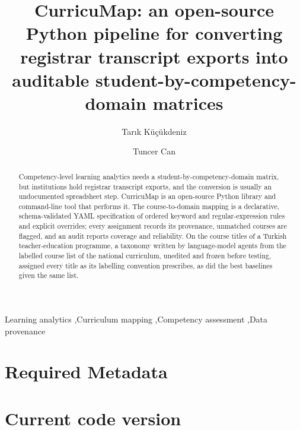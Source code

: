 \documentclass[preprint,12pt,a4paper]{elsarticle}
\begin{document}
\begin{frontmatter}

\title{CurricuMap: an open-source Python pipeline for converting registrar transcript exports into auditable student-by-competency-domain matrices}

\author[iue]{Tar{\i}k K\"u\c{c}\"ukdeniz}
\author[elt]{Tuncer Can}


\begin{abstract}
Competency-level learning analytics needs a student-by-competency-domain matrix, but institutions hold registrar transcript exports, and the conversion is usually an undocumented spreadsheet step. CurricuMap is an open-source Python library and command-line tool that performs it. The course-to-domain mapping is a declarative, schema-validated YAML specification of ordered keyword and regular-expression rules and explicit overrides; every assignment records its provenance, unmatched courses are flagged, and an audit reports coverage and reliability. On the \nTitles{} course titles of a Turkish teacher-education programme, a taxonomy written by language-model agents from the labelled course list of the national curriculum, unedited and frozen before testing, assigned every title as its labelling convention prescribes, as did the best baselines given the same list.
\end{abstract}

\begin{keyword}
Learning analytics \sep Curriculum mapping \sep Competency assessment \sep Data provenance
\end{keyword}

\end{frontmatter}

\section*{Required Metadata}
\label{metadata}

\section*{Current code version}
\end{document}
